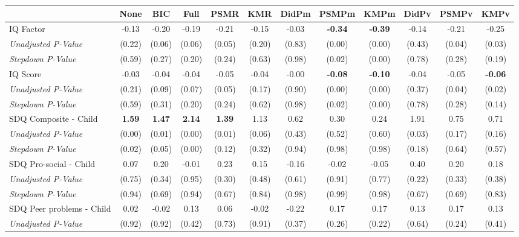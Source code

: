 \begin{tabular}{l c c c c c c c c c c c}
\toprule
 & None & BIC & Full & PSMR & KMR & DidPm & PSMPm & KMPm & DidPv & PSMPv & KMPv \\
\midrule
IQ Factor & -0.13 & -0.20 & -0.19 & -0.21 & -0.15 & -0.03 & \textbf{ -0.34 } & \textbf{ -0.39 } & -0.14 & -0.21 & -0.25 \\
\quad \textit{Unadjusted P-Value} & (0.22) & (0.06) & (0.06) & (0.05) & (0.20) & (0.83) & (0.00) & (0.00) & (0.43) & (0.04) & (0.03) \\
\quad \textit{Stepdown P-Value} & (0.59) & (0.27) & (0.20) & (0.24) & (0.63) & (0.98) & (0.02) & (0.00) & (0.78) & (0.28) & (0.19) \\
IQ Score & -0.03 & -0.04 & -0.04 & -0.05 & -0.04 & -0.00 & \textbf{ -0.08 } & \textbf{ -0.10 } & -0.04 & -0.05 & \textbf{ -0.06 } \\
\quad \textit{Unadjusted P-Value} & (0.21) & (0.09) & (0.07) & (0.05) & (0.17) & (0.90) & (0.00) & (0.00) & (0.37) & (0.04) & (0.02) \\
\quad \textit{Stepdown P-Value} & (0.59) & (0.31) & (0.20) & (0.24) & (0.62) & (0.98) & (0.02) & (0.00) & (0.78) & (0.28) & (0.14) \\
SDQ Composite - Child & \textbf{ 1.59 } & \textbf{ 1.47 } & \textbf{ 2.14 } & \textbf{ 1.39 } & 1.13 & 0.62 & 0.30 & 0.24 & 1.91 & 0.75 & 0.71 \\
\quad \textit{Unadjusted P-Value} & (0.00) & (0.01) & (0.00) & (0.01) & (0.06) & (0.43) & (0.52) & (0.60) & (0.03) & (0.17) & (0.16) \\
\quad \textit{Stepdown P-Value} & (0.02) & (0.05) & (0.00) & (0.12) & (0.32) & (0.94) & (0.98) & (0.98) & (0.18) & (0.64) & (0.57) \\
SDQ Pro-social - Child & 0.07 & 0.20 & -0.01 & 0.23 & 0.15 & -0.16 & -0.02 & -0.05 & 0.40 & 0.20 & 0.18 \\
\quad \textit{Unadjusted P-Value} & (0.75) & (0.34) & (0.95) & (0.30) & (0.48) & (0.61) & (0.91) & (0.77) & (0.22) & (0.33) & (0.38) \\
\quad \textit{Stepdown P-Value} & (0.94) & (0.69) & (0.94) & (0.67) & (0.84) & (0.98) & (0.99) & (0.98) & (0.67) & (0.69) & (0.83) \\
SDQ Peer problems - Child & 0.02 & -0.02 & 0.13 & 0.06 & -0.02 & -0.22 & 0.17 & 0.17 & 0.13 & 0.17 & 0.13 \\
\quad \textit{Unadjusted P-Value} & (0.92) & (0.92) & (0.42) & (0.73) & (0.91) & (0.37) & (0.26) & (0.22) & (0.64) & (0.24) & (0.41) \\

\end{tabular}
